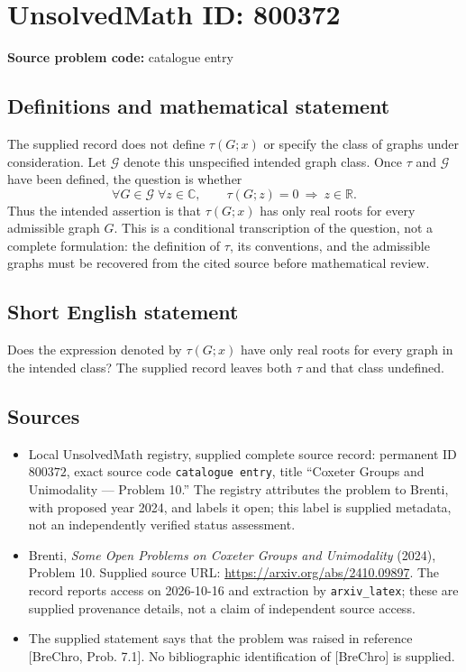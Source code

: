 \documentclass[11pt]{article}
\newcommand{\R}{\mathbb{R}}
\newcommand{\C}{\mathbb{C}}
\begin{document}
\section*{UnsolvedMath ID: 800372}
\textbf{Source problem code:} catalogue entry
\subsection{Definitions and mathematical statement}
The supplied record does not define \(\tau(G;x)\) or specify the class of graphs under consideration. Let \(\mathcal G\) denote this unspecified intended graph class. Once \(\tau\) and \(\mathcal G\) have been defined, the question is whether
\[
\forall G\in\mathcal G\;\forall z\in\C,\qquad \tau(G;z)=0\ \Longrightarrow\ z\in\R.
\]
Thus the intended assertion is that \(\tau(G;x)\) has only real roots for every admissible graph \(G\). This is a conditional transcription of the question, not a complete formulation: the definition of \(\tau\), its conventions, and the admissible graphs must be recovered from the cited source before mathematical review.
\subsection{Short English statement}
Does the expression denoted by \(\tau(G;x)\) have only real roots for every graph in the intended class? The supplied record leaves both \(\tau\) and that class undefined.
\subsection{Sources}
\begin{itemize}
\item Local UnsolvedMath registry, supplied complete source record: permanent ID \(800372\), exact source code \texttt{catalogue entry}, title ``Coxeter Groups and Unimodality --- Problem 10.'' The registry attributes the problem to Brenti, with proposed year 2024, and labels it open; this label is supplied metadata, not an independently verified status assessment.
\item Brenti, \emph{Some Open Problems on Coxeter Groups and Unimodality} (2024), Problem 10. Supplied source URL: \url{https://arxiv.org/abs/2410.09897}. The record reports access on 2026-10-16 and extraction by \texttt{arxiv\_latex}; these are supplied provenance details, not a claim of independent source access.
\item The supplied statement says that the problem was raised in reference [BreChro, Prob. 7.1]. No bibliographic identification of [BreChro] is supplied.
\end{itemize}
\end{document}
